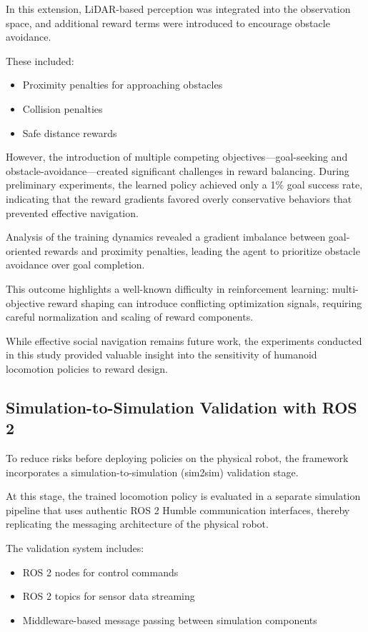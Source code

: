 \documentclass[pdflatex,sn-mathphys-num]{sn-jnl}%
\theoremstyle{thmstyleone}%
\theoremstyle{thmstyletwo}%
\theoremstyle{thmstylethree}%
\begin{document}
In this extension, LiDAR-based perception was integrated into the observation space, and additional reward terms were introduced to encourage obstacle avoidance.

These included:
\begin{itemize}
    \item Proximity penalties for approaching obstacles
    \item Collision penalties
    \item Safe distance rewards
\end{itemize} 

However, the introduction of multiple competing objectives—goal-seeking and obstacle-avoidance—created significant challenges in reward balancing. During preliminary experiments, the learned policy achieved only a 1\% goal success rate, indicating that the reward gradients favored overly conservative behaviors that prevented effective navigation.

Analysis of the training dynamics revealed a gradient imbalance between goal-oriented rewards and proximity penalties, leading the agent to prioritize obstacle avoidance over goal completion.

This outcome highlights a well-known difficulty in reinforcement learning: multi-objective reward shaping can introduce conflicting optimization signals, requiring careful normalization and scaling of reward components.

While effective social navigation remains future work, the experiments conducted in this study provided valuable insight into the sensitivity of humanoid locomotion policies to reward design.

\subsection{Simulation-to-Simulation Validation with ROS 2}
To reduce risks before deploying policies on the physical robot, the framework incorporates a simulation-to-simulation (sim2sim) validation stage.

At this stage, the trained locomotion policy is evaluated in a separate simulation pipeline that uses authentic ROS 2 Humble communication interfaces, thereby replicating the messaging architecture of the physical robot.

The validation system includes:
\begin{itemize}
    \item ROS 2 nodes for control commands
    \item ROS 2 topics for sensor data streaming
    \item Middleware-based message passing between simulation components
\end{itemize} 
\end{document}
